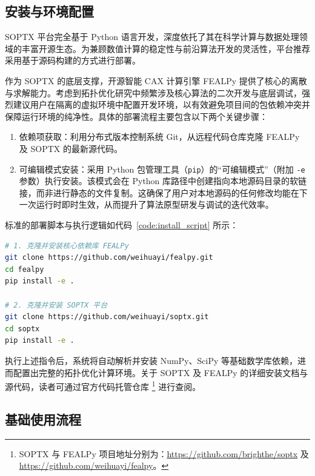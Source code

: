 \subsection{安装与环境配置}
\label{subsec:soptx_installation}

SOPTX 平台完全基于 Python 语言开发，深度依托了其在科学计算与数据处理领域的丰富开源生态。为兼顾数值计算的稳定性与前沿算法开发的灵活性，平台推荐采用基于源码构建的方式进行部署。

作为 SOPTX 的底层支撑，开源智能 CAX 计算引擎 FEALPy 提供了核心的离散与求解能力。考虑到拓扑优化研究中频繁涉及核心算法的二次开发与底层调试，强烈建议用户在隔离的虚拟环境中配置开发环境，以有效避免项目间的包依赖冲突并保障运行环境的纯净性。具体的部署流程主要包含以下两个关键步骤：
\begin{enumerate}[
	label={（\arabic*）},
	labelsep=0.25em,
	leftmargin=3.2em,
	itemsep=0.4em,
	topsep=0.4em,
	parsep=0pt,
	partopsep=0pt
	]
	\item 依赖项获取：利用分布式版本控制系统 Git，从远程代码仓库克隆 FEALPy 及 SOPTX 的最新源代码。
	
	\item 可编辑模式安装：采用 Python 包管理工具（\texttt{pip}）的“可编辑模式”（附加 \texttt{-e} 参数）执行安装。该模式会在 Python 库路径中创建指向本地源码目录的软链接，而非进行静态的文件复制。这确保了用户对本地源码的任何修改均能在下一次运行时即时生效，从而提升了算法原型研发与调试的迭代效率。
\end{enumerate}
标准的部署脚本与执行逻辑如代码~\ref{code:install_script} 所示：
\begin{lstlisting}[language=bash, 
	caption={SOPTX 及 FEALPy 源码安装脚本}, 
	label={code:install_script},
	float=htbp]
# 1. 克隆并安装核心依赖库 FEALPy
git clone https://github.com/weihuayi/fealpy.git
cd fealpy
pip install -e .

# 2. 克隆并安装 SOPTX 平台
git clone https://github.com/weihuayi/soptx.git
cd soptx
pip install -e .
\end{lstlisting}

执行上述指令后，系统将自动解析并安装 NumPy、SciPy 等基础数学库依赖，进而配置出完整的拓扑优化计算环境。关于 SOPTX 及 FEALPy 的详细安装文档与源代码，读者可通过官方代码托管仓库 \footnote{SOPTX 与 FEALPy 项目地址分别为：\url{https://github.com/brighthe/soptx} 及 \url{https://github.com/weihuayi/fealpy}。} 进行查阅。


\subsection{基础使用流程}
\label{subsec:soptx_basic_workflow}

